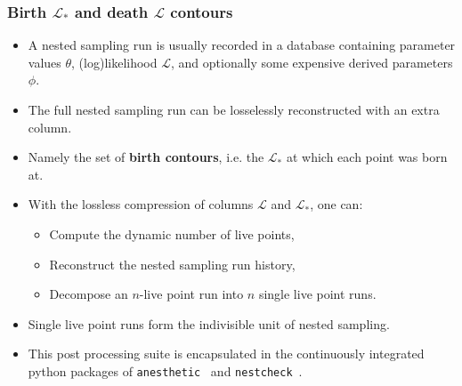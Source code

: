 \documentclass[aspectratio=169]{beamer}
\begin{document}
\begin{frame}
    \frametitle{Birth $\mathcal{L}_*$ and death $\mathcal{L}$ contours}
    \begin{itemize}
        \item A nested sampling run is usually recorded in a database containing parameter values $\theta$, (log)likelihood $\mathcal{L}$, and optionally some expensive derived parameters $\phi$.
        \item The full nested sampling run can be losselessly reconstructed with an extra column.
        \item Namely the set of \textbf{birth contours}, i.e. the $\mathcal{L}_*$ at which each point was born at.
        \item With the lossless compression of columns $\mathcal{L}$ and $\mathcal{L}_*$, one can:
            \begin{itemize}
                \item Compute the dynamic number of live points,
                \item Reconstruct the nested sampling run history,
                \item Decompose an $n$-live point run into $n$ single live point runs.
            \end{itemize}
        \item Single live point runs form the indivisible unit of nested sampling.
        \item This post processing suite is encapsulated in the continuously integrated python packages of \texttt{anesthetic}~ and \texttt{nestcheck}~.
    \end{itemize}

\end{frame}
\end{document}
